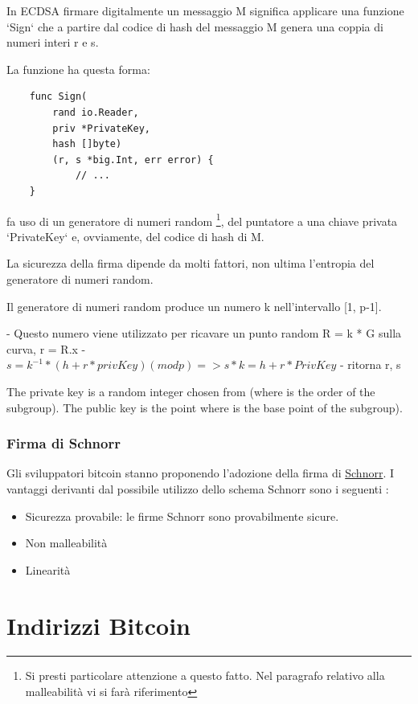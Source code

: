 \documentclass{book}
\theoremstyle{definition}
\begin{document}
In ECDSA firmare digitalmente un messaggio M significa applicare una funzione `Sign` che a partire dal codice di hash del messaggio M genera una coppia di numeri interi r e s.

La funzione ha questa forma:

\begin{lstlisting}
    func Sign(
        rand io.Reader, 
        priv *PrivateKey, 
        hash []byte) 
        (r, s *big.Int, err error) {
            // ...
    }
\end{lstlisting}

fa uso di un generatore di numeri random 
\footnote{Si presti particolare attenzione a questo fatto. Nel paragrafo relativo alla malleabilità vi si farà riferimento}, 
del puntatore a una chiave privata `PrivateKey` e, ovviamente, del codice di hash di M.

La sicurezza della firma dipende da molti fattori, non ultima l'entropia del generatore di numeri random.

Il generatore di numeri random produce un numero k nell'intervallo [1, p-1].

- Questo numero viene utilizzato per ricavare un punto random R = k * G sulla curva, r = R.x
- $s = k^{-1} * (h + r * privKey) (mod p) => s * k = h + r * PrivKey$
- ritorna r, s

The private key is a random integer chosen from  (where  is the order of the subgroup).
The public key is the point where  is the base point of the subgroup).

\subsubsection{Firma di Schnorr} \label{Schnorr}

Gli sviluppatori bitcoin stanno proponendo l'adozione della firma di \href{https://en.bitcoin.it/wiki/Schnorr}{Schnorr}.
I vantaggi derivanti dal possibile utilizzo dello schema Schnorr sono i seguenti \cite{BipSchnorr}:

\begin{itemize}
    \item Sicurezza provabile: le firme Schnorr sono provabilmente sicure.
    \item Non malleabilità
    \item Linearità
\end{itemize}

\newpage
\section{Indirizzi Bitcoin}
\end{document}
